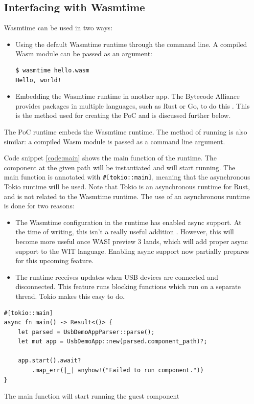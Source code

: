 \subsection{Interfacing with Wasmtime}
Wasmtime can be used in two ways: 
\begin{itemize}
\item Using the default Wasmtime runtime through the command line. A compiled \acrshort{Wasm} module can be passed as an argument:
\begin{verbatim}
$ wasmtime hello.wasm
Hello, world!
\end{verbatim}
\item Embedding the Wasmtime runtime in another app. The Bytecode Alliance provides packages in multiple languages, such as Rust or Go, to do this \cite{wasmtime_website}. This is the method used for creating the \acrshort{PoC} and is discussed further below.
\end{itemize}

The \acrshort{PoC} runtime embeds the Wasmtime runtime. The method of running is also similar: a compiled \acrshort{Wasm} module is passed as a command line argument.

Code snippet \ref{code:main} shows the main function of the runtime. The component at the given path will be instantiated and will start running. The main function is annotated with \texttt{\#[tokio::main]}, meaning that the asynchronous Tokio runtime \cite{tokio} will be used. Note that Tokio is an asynchronous runtime for Rust, and is not related to the Wasmtime runtime. The use of an asynchronous runtime is done for two reasons:
\begin{itemize}
\item The Wasmtime configuration in the runtime has enabled async support. At the time of writing, this isn't a really useful addition \cite{wasmtime_async_config}. However, this will become more useful once \acrshort{WASI} preview 3 lands, which will add proper async support to the \acrshort{WIT} language. Enabling async support now partially prepares for this upcoming feature.

\item The runtime receives updates when USB devices are connected and disconnected. This feature runs blocking functions which run on a separate thread. Tokio makes this easy to do.\\
\end{itemize}


\begin{code}
\begin{verbatim}
#[tokio::main]
async fn main() -> Result<()> {
	let parsed = UsbDemoAppParser::parse();
	let mut app = UsbDemoApp::new(parsed.component_path)?;

	app.start().await?
		.map_err(|_| anyhow!("Failed to run component."))
}
\end{verbatim}
\caption{The main function will start running the guest component}
\label{code:main}
\end{code}

